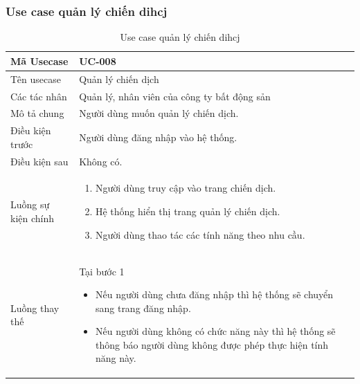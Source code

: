 \documentclass[12pt,a4paper]{article}
\begin{document}
    \subsubsection*{Use case quản lý chiến dihcj}
    \begin{table}[H]
        \centering
        \begin{tabular}{|p{3.5cm}|p{11.5cm}|c|}
            \hline
            Mã Usecase      & UC-008                                      \\
            \hline
            Tên usecase     & Quản lý chiến dịch                          \\
            \hline
            Các tác nhân    & Quản lý, nhân viên của công ty bất động sản \\
            \hline
            Mô tả chung     & Người dùng muốn quản lý chiến dịch.         \\
            \hline

            Điều kiện trước & Người dùng đăng nhập vào hệ thống.          \\
            \hline

            Điều kiện sau   & Không có.                                   \\
            \hline

            Luồng sự kiện chính & \vspace{-.8cm}\begin{enumerate}
                                                    \item Người dùng truy cập vào trang chiến dịch.
                                                    \item Hệ thống hiển thị trang quản lý chiến dịch.
                                                    \item Người dùng thao tác các tính năng theo nhu cầu.
            \end{enumerate}
            \\
            \hline
            Luồng thay thế & Tại bước 1\newline
            \vspace{-.8cm}\begin{itemize}
                              \item Nếu người dùng chưa đăng nhập thì hệ thống sẽ chuyển sang trang đăng nhập.
                              \item Nếu người dùng không có chức năng này thì hệ thống sẽ thông báo người dùng không được phép thực hiện tính năng này.
            \end{itemize}

            \\ \hline
        \end{tabular}
        \caption{Use case quản lý chiến dihcj}

    \end{table}
\end{document}
